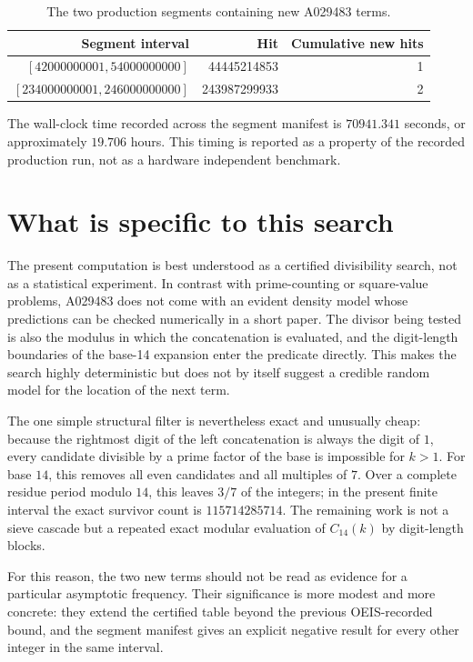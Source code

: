 \documentclass[11pt]{article}
\theoremstyle{definition}
\theoremstyle{remark}
\begin{document}
\begin{table}[ht]
\centering
\begin{tabular}{rrr}
\toprule
Segment interval & Hit & Cumulative new hits\\
\midrule
\([42000000001,54000000000]\) & 44445214853 & 1\\
\([234000000001,246000000000]\) & 243987299933 & 2\\
\bottomrule
\end{tabular}
\caption{The two production segments containing new A029483 terms.}
\label{tab:hitsegments}
\end{table}

The wall-clock time recorded across the segment manifest is
\(70941.341\) seconds, or approximately \(19.706\) hours.  This timing is
reported as a property of the recorded production run, not as a hardware
independent benchmark.

\section{What is specific to this search}
\label{sec:specificity}

The present computation is best understood as a certified divisibility search,
not as a statistical experiment.  In contrast with prime-counting or
square-value problems, A029483 does not come with an evident density model
whose predictions can be checked numerically in a short paper.  The divisor
being tested is also the modulus in which the concatenation is evaluated, and
the digit-length boundaries of the base-14 expansion enter the predicate
directly.  This makes the search highly deterministic but does not by itself
suggest a credible random model for the location of the next term.

The one simple structural filter is nevertheless exact and unusually cheap:
because the rightmost digit of the left concatenation is always the digit of
\(1\), every candidate divisible by a prime factor of the base is impossible
for \(k>1\).  For base \(14\), this removes all even candidates and all
multiples of \(7\).  Over a complete residue period modulo \(14\), this leaves
\(3/7\) of the integers; in the present finite interval the exact survivor
count is \(115714285714\).  The remaining work is not a sieve cascade but a
repeated exact modular evaluation of \(C_{14}(k)\) by digit-length blocks.

For this reason, the two new terms should not be read as evidence for a
particular asymptotic frequency.  Their significance is more modest and more
concrete: they extend the certified table beyond the previous OEIS-recorded
bound, and the segment manifest gives an explicit negative result for every
other integer in the same interval.
\end{document}
